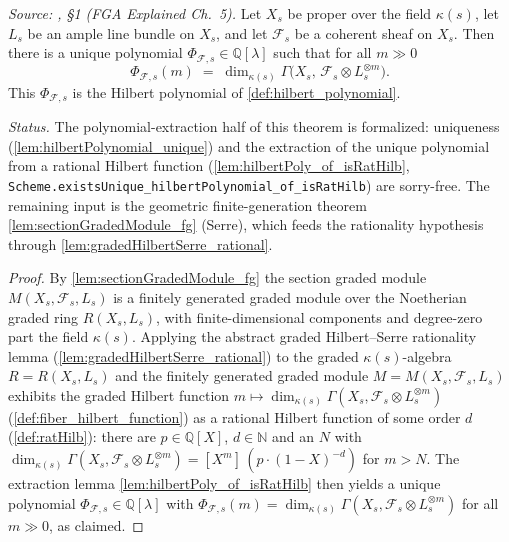 \begin{theorem}
  \label{thm:hilbertPoly_of_sectionModule}
  \textit{Source: \cite{nitsure-hilbert-quot}, \S 1 (FGA Explained Ch.~5).}
  Let \(X_s\) be proper over the field \(\kappa(s)\), let \(L_s\) be an ample line
  bundle on \(X_s\), and let \(\mathcal{F}_s\) be a coherent sheaf on \(X_s\).
  Then there is a unique polynomial \(\Phi_{\mathcal{F},s} \in \mathbb{Q}[\lambda]\)
  such that for all \(m \gg 0\)
  \[
    \Phi_{\mathcal{F},s}(m)
    \;=\; \dim_{\kappa(s)} \Gamma\bigl(X_s,\, \mathcal{F}_s \otimes L_s^{\otimes m}\bigr).
  \]
  This \(\Phi_{\mathcal{F},s}\) is the Hilbert polynomial of
  \cref{def:hilbert_polynomial}.

  \emph{Status.} The polynomial-extraction half of this theorem is formalized:
  uniqueness (\cref{lem:hilbertPolynomial_unique}) and the extraction of the
  unique polynomial from a rational Hilbert function
  (\cref{lem:hilbertPoly_of_isRatHilb},
  \texttt{Scheme.existsUnique\_hilbertPolynomial\_of\_isRatHilb}) are
  sorry-free. The remaining input is the geometric finite-generation theorem
  \cref{lem:sectionGradedModule_fg} (Serre), which feeds the rationality
  hypothesis through \cref{lem:gradedHilbertSerre_rational}.
\end{theorem}

\begin{proof}
  By \cref{lem:sectionGradedModule_fg} the section graded module
  \(M(X_s, \mathcal{F}_s, L_s)\) is a finitely generated graded module over the
  Noetherian graded ring \(R(X_s, L_s)\), with finite-dimensional components and
  degree-zero part the field \(\kappa(s)\). Applying the abstract graded
  Hilbert--Serre rationality lemma (\cref{lem:gradedHilbertSerre_rational}) to the
  graded \(\kappa(s)\)-algebra \(R = R(X_s, L_s)\) and the finitely generated
  graded module \(M = M(X_s, \mathcal{F}_s, L_s)\) exhibits the graded Hilbert
  function
  \(m \mapsto \dim_{\kappa(s)} \Gamma(X_s, \mathcal{F}_s \otimes L_s^{\otimes m})\)
  (\cref{def:fiber_hilbert_function}) as a rational Hilbert function of some
  order \(d\) (\cref{def:ratHilb}): there are \(p \in \mathbb{Q}[X]\),
  \(d \in \mathbb{N}\) and an \(N\) with
  \(\dim_{\kappa(s)} \Gamma(X_s, \mathcal{F}_s \otimes L_s^{\otimes m})
  = [X^m]\,(p \cdot (1 - X)^{-d})\) for \(m > N\). The extraction lemma
  \cref{lem:hilbertPoly_of_isRatHilb} then yields a unique polynomial
  \(\Phi_{\mathcal{F},s} \in \mathbb{Q}[\lambda]\) with
  \(\Phi_{\mathcal{F},s}(m) = \dim_{\kappa(s)}
  \Gamma(X_s, \mathcal{F}_s \otimes L_s^{\otimes m})\) for all \(m \gg 0\),
  as claimed.
\end{proof}

